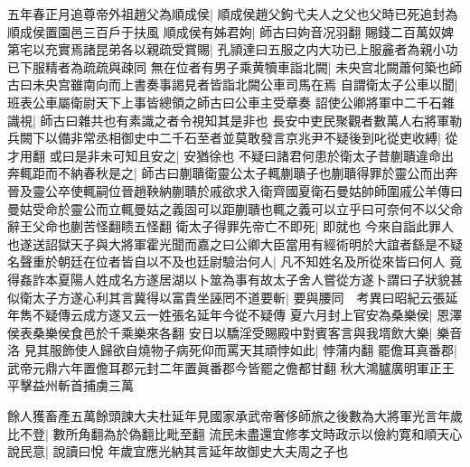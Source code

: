 五年春正月追尊帝外祖趙父為順成侯|{
	順成侯趙父鉤弋夫人之父也父時已死追封為順成侯置園邑三百戶于扶風}
順成侯有姊君姁|{
	師古曰姁音况羽翻}
賜錢二百萬奴婢第宅以充實焉諸昆弟各以親疏受賞賜|{
	孔頴達曰五服之内大功已上服麄者為親小功已下服精者為疏疏與疎同}
無在位者有男子乘黄犢車詣北闕|{
	未央宫北闕蕭何築也師古曰未央宫雖南向而上書奏事謁見者皆詣北闕公車司馬在焉}
自謂衛太子公車以聞|{
	班表公車屬衛尉天下上事皆總領之師古曰公車主受章奏}
詔使公卿將軍中二千石雜識視|{
	師古曰雜共也有素識之者令視知其是非也}
長安中吏民聚觀者數萬人右將軍勒兵闕下以備非常丞相御史中二千石至者並莫敢發言京兆尹不疑後到叱從吏收縛|{
	從才用翻}
或曰是非未可知且安之|{
	安猶徐也}
不疑曰諸君何患於衛太子昔蒯聵違命出奔輒距而不納春秋是之|{
	師古曰蒯聵衛靈公太子輒蒯聵子也蒯聵得罪於靈公而出奔晉及靈公卒使輒嗣位晉趙鞅納蒯聵於戚欲求入衛齊國夏衛石曼姑帥師圍戚公羊傳曰曼姑受命於靈公而立輒曼姑之義固可以距蒯聵也輒之義可以立乎曰可奈何不以父命辭王父命也蒯苦怪翻瞆五怪翻}
衛太子得罪先帝亡不即死|{
	即就也}
今來自詣此罪人也遂送詔獄天子與大將軍霍光聞而嘉之曰公卿大臣當用有經術明於大誼者繇是不疑名聲重於朝廷在位者皆自以不及也廷尉驗治何人|{
	凡不知姓名及所從來皆曰何人}
竟得姦詐本夏陽人姓成名方遂居湖以卜筮為事有故太子舍人嘗從方遂卜謂曰子狀貌甚似衛太子方遂心利其言冀得以富貴坐誣罔不道要斬|{
	要與腰同　考異曰昭紀云張延年雋不疑傳云成方遂又云一姓張名延年今從不疑傳}
夏六月封上官安為桑樂侯|{
	恩澤侯表桑樂侯食邑於千乘樂來各翻}
安日以驕淫受賜殿中對賓客言與我壻飲大樂|{
	樂音洛}
見其服飾使人歸欲自燒物子病死仰而罵天其頑悖如此|{
	悖蒲内翻}
罷儋耳真番郡|{
	武帝元鼎六年置儋耳郡元封二年置眞番郡今皆罷之儋都甘翻}
秋大鴻臚廣明軍正王平擊益州斬首捕虜三萬

餘人獲畜產五萬餘頭諫大夫杜延年見國家承武帝奢侈師旅之後數為大將軍光言年歲比不登|{
	數所角翻為於偽翻比毗至翻}
流民未盡還宜修孝文時政示以儉約寛和順天心說民意|{
	說讀曰悅}
年歲宜應光納其言延年故御史大夫周之子也

